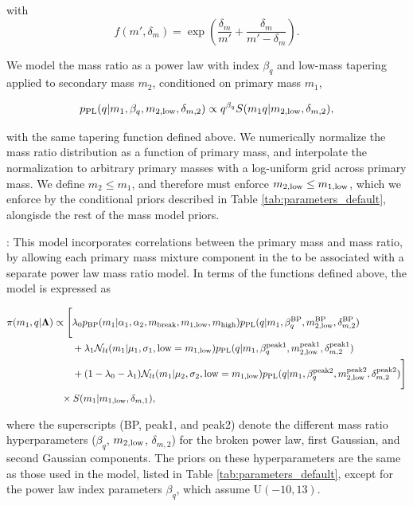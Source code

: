 \noindent with
$$
f(m', \delta_m) = \exp \left( \frac{\delta_m}{m'} + \frac{\delta_m}{m' - \delta_m} \right).
$$

We model the mass ratio as a power law with index $\beta_q$ and low-mass tapering applied to secondary mass $m_2$, conditioned on primary mass $m_1$,

\begin{equation}
p_{\rm PL}(q | m_1, \beta_q, m_{2,{\rm low}}, \delta_{m,2}) \propto q^{\beta_q} S(m_1 q | m_{2,{\rm low}}, \delta_{m,2}),
\end{equation}

\noindent with the same tapering function defined above. We numerically normalize the mass ratio distribution as a function of primary mass, and interpolate the normalization to arbitrary primary masses with a log-uniform grid across primary mass. We define $m_2 \leq m_1$, and therefore must enforce $m_{2, {\rm low}} \le m_{1, {\rm low}}$, which we enforce by the conditional priors described in Table \ref{tab:parameters_default}, alongisde the rest of the mass model priors.

\ExtendedBrokenPLTwoPeaks : This model incorporates correlations between the primary mass and mass ratio, by allowing each primary mass mixture component in the \BrokenPLTwoPeaks to be associated with a separate power law mass ratio model. In terms of the functions defined above, the model is expressed as

\begin{align} \label{eq:exbp2p}
\pi(m_1, q | {\PEhyperparam})\propto \Biggl[ &\lambda_0 p_{\rm BP}(m_1|\alpha_1, \alpha_2, m_{\rm break}, m_{1,{\rm low}}, m_{\rm high}) p_{\rm PL}(q | m_1, \beta_q^{\rm BP}, m_{2,{\rm low}}^{\rm BP}, \delta_{m,2}^{\rm BP})  \\ \nonumber
& + \lambda_1 \mathcal{N}_{lt}(m_1 | \mu_1, \sigma_1, \text{low} = m_{1,{\rm low}}) p_{\rm PL}(q | m_1, \beta_q^{\rm peak1}, m_{2,{\rm low}}^{\rm peak1}, \delta_{m,2}^{\rm peak1}) \\ \nonumber
&  + (1 - \lambda_0 - \lambda_1) \mathcal{N}_{lt}(m_1|\mu_2, \sigma_2, \text{low} = m_{1,{\rm low}}) p_{\rm PL}(q | m_1, \beta_q^{\rm peak2}, m_{2,{\rm low}}^{\rm peak2}, \delta_{m,2}^{\rm peak2}) \Biggr] \\ & \hspace{-4mm} \times S(m_1 | m_{1,{\rm low}}, \delta_{m,1}),\nonumber
\end{align}

\noindent where the superscripts (BP, peak1, and peak2) denote the different mass ratio hyperparameters ($\beta_q$, $m_{2,{\rm low}}$, $\delta_{m,2}$) for the broken power law, first Gaussian, and second Gaussian components. The priors on these hyperparameters are the same as those used in the \BrokenPLTwoPeaks model, listed in Table \ref{tab:parameters_default}, except for the power law index parameters $\beta_q$, which assume U$(-10,13)$.

